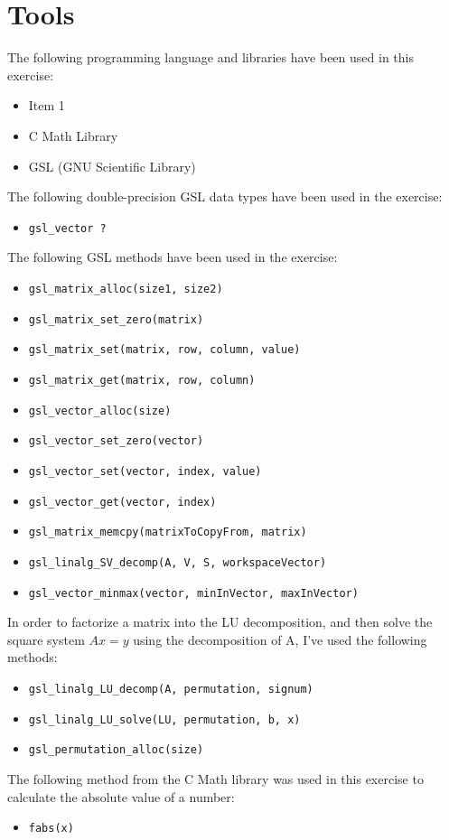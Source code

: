 \documentclass{article}
\newcommand{\code}{\texttt}
\begin{document}
\section{Tools}
The following programming language and libraries have been used in this exercise:
\begin{itemize}
  \item Item 1
  \item C Math Library
  \item GSL (GNU Scientific Library)
\end{itemize}
The following double-precision GSL data types have been used in the exercise:
\begin{itemize}
  \item \code{gsl\_vector ?}
\end{itemize}
The following GSL methods have been used in the exercise:
\begin{itemize}
  \item \code{gsl\_matrix\_alloc(size1, size2)}
  \item \code{gsl\_matrix\_set\_zero(matrix)}
  \item \code{gsl\_matrix\_set(matrix, row, column, value)}
  \item \code{gsl\_matrix\_get(matrix, row, column)}
  \item \code{gsl\_vector\_alloc(size)}
  \item \code{gsl\_vector\_set\_zero(vector)}
  \item \code{gsl\_vector\_set(vector, index, value)}
  \item \code{gsl\_vector\_get(vector, index)}
  \item \code{gsl\_matrix\_memcpy(matrixToCopyFrom, matrix)}
  \item \code{gsl\_linalg\_SV\_decomp(A, V, S, workspaceVector)}
  \item \code{gsl\_vector\_minmax(vector, minInVector, maxInVector)}
\end{itemize}
In order to factorize a matrix into the LU decomposition, and then solve the square system $Ax=y$ using the decomposition of A, I've used the following methods:
\begin{itemize}
  \item \code{gsl\_linalg\_LU\_decomp(A, permutation, signum)}
  \item \code{gsl\_linalg\_LU\_solve(LU, permutation, b, x)}
  \item \code{gsl\_permutation\_alloc(size)}
\end{itemize}
The following method from the C Math library was used in this exercise to calculate the absolute value of a number:
\begin{itemize}
  \item \code{fabs(x)}
\end{itemize}
  
\end{document}
